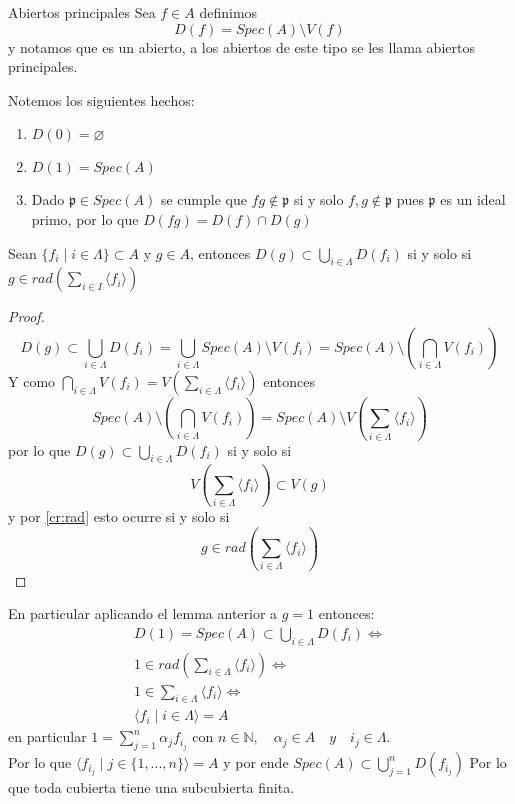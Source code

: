 \documentclass{article}
\begin{document}
\begin{definicion}{Abiertos principales}{}
    Sea $f\in A$ definimos
    $$D(f) = Spec(A) \setminus V(f)$$
    y notamos que es un abierto, a los abiertos de 
    este tipo se les llama abiertos principales.
\end{definicion}

\begin{observacion}{}{}
    Notemos los siguientes hechos:
    \begin{enumerate}
        \item $D(0)=\varnothing$
        \item $D(1)=Spec(A)$
        \item Dado $\mathfrak{p} \in Spec(A)$ se cumple
        que $fg \notin \mathfrak{p}$ si y solo $f,g \notin \mathfrak{p}$
        pues $\mathfrak{p}$ es un ideal primo, por lo que $D(fg)= D(f)\cap D(g)$
    \end{enumerate}
    
\end{observacion}

\begin{lema}{}{}
    Sean $\{f_i\mid i\in \Lambda\} \subset A$ y $g \in A$,
    entonces $D(g)\subset \bigcup_{i\in \Lambda}D(f_i) $ si y solo si
    $g \in rad \left( \sum_{i\in I} \langle f_i \rangle\right)$
\end{lema}
\begin{proof}
    $$D(g) \subset \bigcup_{i\in \Lambda}D(f_i) = \bigcup_{i\in  \Lambda} Spec(A)\setminus V(f_i)
    = Spec(A)\setminus \left( \bigcap_{i\in  \Lambda}V(f_i)\right) $$
    Y como $\bigcap_{i\in  \Lambda}V(f_i) = V(\sum_{i\in \Lambda}\langle f_i \rangle)$
    entonces $$Spec(A)\setminus \left(\bigcap_{i\in  \Lambda}V(f_i) \right) = Spec(A)\setminus V\left(\sum_{i\in \Lambda}\langle f_i \rangle\right)$$
    por lo que $D(g)\subset \bigcup_{i \in \Lambda}D(f_i)$ si y solo si
    $$V\left(\sum_{i\in \Lambda}\langle f_i \rangle \right) \subset V(g)$$
    y por \ref{cr:rad} esto ocurre si y solo si
    $$g \in rad \left(\sum_{i\in \Lambda}\langle f_i \rangle\right)$$
\end{proof}

\begin{observacion}{}{}
    En particular aplicando el lemma anterior a 
    $g = 1$ entonces:
    \begin{align}
        D(1) = Spec(A) \subset \bigcup_{i \in \Lambda } D(f_i) \iff\\
        1 \in rad(\sum_{i\in \Lambda} \langle f_i \rangle) \iff \\
        1\in \sum_{i\in \Lambda} \langle f_i \rangle \iff \\
        \langle f_i \mid i\in \Lambda \rangle = A
    \end{align} 
    en particular $1 = \sum_{j=1}^{n} \alpha_j f_{i_j}$ con $n\in \mathbb{N}, \quad \alpha_j \in A \quad y \quad i_j \in \Lambda$.\\
    Por lo que $\langle f_{i_j}\mid j\in\{1,...,n \} \rangle = A$
    y por ende $Spec(A) \subset \bigcup_{j=1}^{n}D(f_{i_j})$
    Por lo que toda cubierta tiene una subcubierta finita.
\end{observacion}
\end{document}
